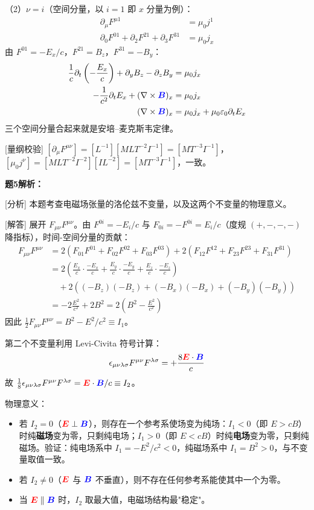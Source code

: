 \documentclass[11pt,a4paper,openany,oneside]{book}
\newcommand{\vecE}{\textcolor{red}{\vect{E}}}
\newcommand{\vecB}{\textcolor{blue}{\vect{B}}}
\newcommand{\eps}{\varepsilon}
\newcommand{\muz}{\mu_0}
\newcommand{\vect}[1]{\bm{#1}}
\newcommand{\curl}{\nabla\times}
\begin{document}
（2）$\nu = i$（空间分量，以 $i=1$ 即 $x$ 分量为例）：
\begin{align*}
\partial_\mu F^{\mu 1} &= \muz j^1 \\
\partial_0 F^{01} + \partial_2 F^{21} + \partial_3 F^{31} &= \muz j_x
\end{align*}
由 $F^{01} = -E_x/c$，$F^{21} = B_z$，$F^{31} = -B_y$：
\begin{align*}
\frac{1}{c}\partial_t\left(-\frac{E_x}{c}\right) + \partial_y B_z - \partial_z B_y &= \muz j_x \\
-\frac{1}{c^2}\partial_t E_x + (\curl\vecB)_x &= \muz j_x \\
(\curl\vecB)_x &= \muz j_x + \muz\eps_0\partial_t E_x
\end{align*}
三个空间分量合起来就是安培--麦克斯韦定律。\qedsymbol

[量纲校验] $[\partial_\mu F^{\mu\nu}] = [L^{-1}][MLT^{-2}I^{-1}] = [MT^{-3}I^{-1}]$，$[\muz j^\nu] = [MLT^{-2}I^{-2}][IL^{-2}] = [MT^{-3}I^{-1}]$，一致。\qedsymbol

\textbf{题5解析：}

[分析] 本题考查电磁场张量的洛伦兹不变量，以及这两个不变量的物理意义。

[解答] 展开 $F_{\mu\nu}F^{\mu\nu}$。由 $F^{0i} = -E_i/c$ 与 $F_{0i} = -F^{0i} = E_i/c$（度规 $(+,-,-,-)$ 降指标），时间-空间分量的贡献：
\begin{align*}
F_{\mu\nu}F^{\mu\nu} &= 2\left(F_{01}F^{01} + F_{02}F^{02} + F_{03}F^{03}\right) + 2\left(F_{12}F^{12} + F_{23}F^{23} + F_{31}F^{31}\right) \\
&= 2\left(\frac{E_x}{c}\cdot\frac{-E_x}{c} + \frac{E_y}{c}\cdot\frac{-E_y}{c} + \frac{E_z}{c}\cdot\frac{-E_z}{c}\right) \\
&\quad + 2\left((-B_z)(-B_z) + (-B_x)(-B_x) + (-B_y)(-B_y)\right) \\
&= -2\frac{E^2}{c^2} + 2B^2 = 2\left(B^2 - \frac{E^2}{c^2}\right)
\end{align*}
因此 $\frac{1}{2}F_{\mu\nu}F^{\mu\nu} = B^2 - E^2/c^2 \equiv I_1$。

第二个不变量利用 Levi-Civita 符号计算：
\[
\epsilon_{\mu\nu\lambda\sigma}F^{\mu\nu}F^{\lambda\sigma} = +\frac{8\vecE\cdot\vecB}{c}
\]
故 $\frac{1}{8}\epsilon_{\mu\nu\lambda\sigma}F^{\mu\nu}F^{\lambda\sigma} = \vecE\cdot\vecB/c \equiv I_2$。

物理意义：
\begin{itemize}
\item 若 $I_2 = 0$（$\vecE\perp\vecB$），则存在一个参考系使场变为纯场：$I_1 < 0$（即 $E > cB$）时纯\textbf{磁场}变为零，只剩纯电场；$I_1 > 0$（即 $E < cB$）时纯\textbf{电场}变为零，只剩纯磁场。验证：纯电场系中 $I_1 = -E^2/c^2 < 0$，纯磁场系中 $I_1 = B^2 > 0$，与不变量取值一致。
\item 若 $I_2 \neq 0$（$\vecE$ 与 $\vecB$ 不垂直），则不存在任何参考系能使其中一个为零。
\item 当 $\vecE\parallel\vecB$ 时，$I_2$ 取最大值，电磁场结构最"稳定"。
\end{itemize}
\end{document}
